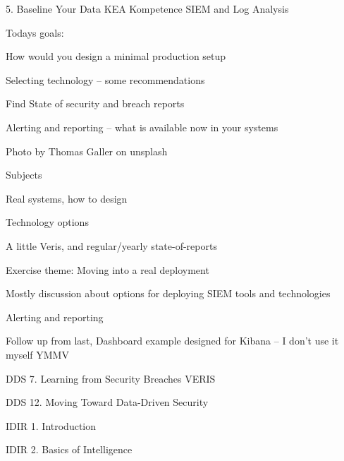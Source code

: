 \documentclass[Screen16to9,17pt]{foils}
\begin{document}
\mytitlepage
{5. Baseline Your Data}
{KEA Kompetence SIEM and Log Analysis}




Todays goals:
\begin{list2}
\item How would you design a minimal production setup
\item Selecting technology -- some recommendations
\item Find State of security and breach reports
\item Alerting and reporting -- what is available now in your systems
\end{list2}

  Photo by Thomas Galler on unsplash


\begin{list1}
\item Subjects
\begin{list2}
\item Real systems, how to design
\item Technology options
\item A little Veris, and regular/yearly state-of-reports
\end{list2}
\item Exercise theme: Moving into a real deployment
\begin{list2}
\item Mostly discussion about options for deploying SIEM tools and technologies
\item Alerting and reporting
\end{list2}
\end{list1}

Follow up from last, Dashboard example designed for Kibana -- I don't use it myself YMMV\\


\begin{list1}
\item DDS 7. Learning from Security Breaches VERIS
\item DDS 12. Moving Toward Data-Driven Security
\item IDIR 1. Introduction
\item IDIR 2. Basics of Intelligence
\end{list1}
\end{document}
